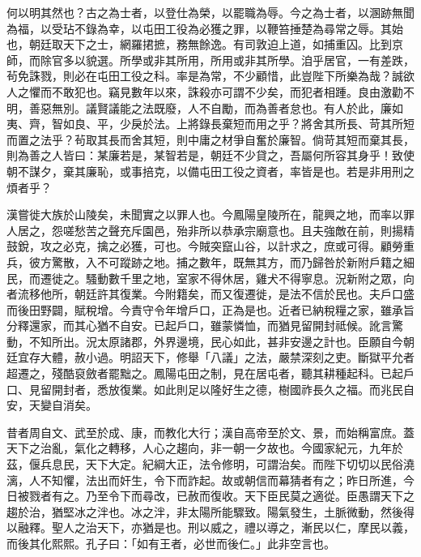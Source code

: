 \begin{pinyinscope}
何以明其然也？古之為士者，以登仕為榮，以罷職為辱。今之為士者，以溷跡無聞為福，以受玷不錄為幸，以屯田工役為必獲之罪，以鞭笞捶楚為尋常之辱。其始也，朝廷取天下之士，網羅捃摭，務無餘逸。有司敦迫上道，如捕重囚。比到京師，而除官多以貌選。所學或非其所用，所用或非其所學。洎乎居官，一有差跌，茍免誅戮，則必在屯田工役之科。率是為常，不少顧惜，此豈陛下所樂為哉？誠欲人之懼而不敢犯也。竊見數年以來，誅殺亦可謂不少矣，而犯者相踵。良由激勸不明，善惡無別。議賢議能之法既廢，人不自勵，而為善者怠也。有人於此，廉如夷、齊，智如良、平，少戾於法。上將錄長棄短而用之乎？將舍其所長、苛其所短而置之法乎？茍取其長而舍其短，則中庸之材爭自奮於廉智。倘苛其短而棄其長，則為善之人皆曰：某廉若是，某智若是，朝廷不少貸之，吾屬何所容其身乎！致使朝不謀夕，棄其廉恥，或事掊克，以備屯田工役之資者，率皆是也。若是非用刑之煩者乎？

漢嘗徙大族於山陵矣，未聞實之以罪人也。今鳳陽皇陵所在，龍興之地，而率以罪人居之，怨嗟愁苦之聲充斥園邑，殆非所以恭承宗廟意也。且夫強敵在前，則揚精鼓銳，攻之必克，擒之必獲，可也。今賊突竄山谷，以計求之，庶或可得。顧勞重兵，彼方驚散，入不可蹤跡之地。捕之數年，既無其方，而乃歸咎於新附戶籍之細民，而遷徙之。騷動數千里之地，室家不得休居，雞犬不得寧息。況新附之眾，向者流移他所，朝廷許其復業。今附籍矣，而又復遷徙，是法不信於民也。夫戶口盛而後田野闢，賦稅增。今責守令年增戶口，正為是也。近者已納稅糧之家，雖承旨分釋還家，而其心猶不自安。已起戶口，雖蒙憐恤，而猶見留開封祗候。訛言驚動，不知所出。況太原諸郡，外界邊境，民心如此，甚非安邊之計也。臣願自今朝廷宜存大體，赦小過。明詔天下，修舉「八議」之法，嚴禁深刻之吏。斷獄平允者超遷之，殘酷裒斂者罷黜之。鳳陽屯田之制，見在居屯者，聽其耕種起科。已起戶口、見留開封者，悉放復業。如此則足以隆好生之德，樹國祚長久之福。而兆民自安，天變自消矣。

昔者周自文、武至於成、康，而教化大行；漢自高帝至於文、景，而始稱富庶。蓋天下之治亂，氣化之轉移，人心之趨向，非一朝一夕故也。今國家紀元，九年於茲，偃兵息民，天下大定。紀綱大正，法令修明，可謂治矣。而陛下切切以民俗澆漓，人不知懼，法出而奸生，令下而詐起。故或朝信而幕猜者有之；昨日所進，今日被戮者有之。乃至令下而尋改，已赦而復收。天下臣民莫之適從。臣愚謂天下之趨於治，猶堅冰之泮也。冰之泮，非太陽所能驟致。陽氣發生，土脈微動，然後得以融釋。聖人之治天下，亦猶是也。刑以威之，禮以導之，漸民以仁，摩民以義，而後其化熙熙。孔子曰：「如有王者，必世而後仁。」此非空言也。


\end{pinyinscope}
